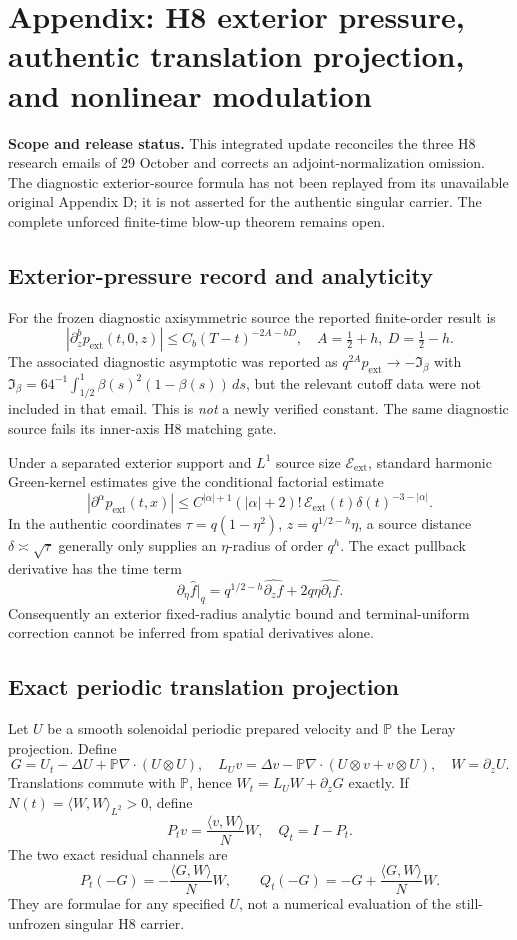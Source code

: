 \clearpage
\section*{Appendix: H8 exterior pressure, authentic translation projection, and nonlinear modulation}
\noindent\textbf{Scope and release status.} This integrated update reconciles the three H8 research emails of 29 October and corrects an adjoint-normalization omission. The diagnostic exterior-source formula has not been replayed from its unavailable original Appendix D; it is not asserted for the authentic singular carrier. The complete unforced finite-time blow-up theorem remains open.

\subsection*{Exterior-pressure record and analyticity}
For the frozen diagnostic axisymmetric source the reported finite-order result is
\[
|\partial_z^bp_{\mathrm{ext}}(t,0,z)|\le C_b(T-t)^{-2A-bD},\quad
A=\tfrac12+h,\ D=\tfrac12-h.
\]
The associated diagnostic asymptotic was reported as $q^{2A}p_{\mathrm{ext}}\to-\mathfrak I_\beta$ with $\mathfrak I_\beta=64^{-1}\int_{1/2}^1\beta(s)^2(1-\beta(s))\,ds$, but the relevant cutoff data were not included in that email. This is \emph{not} a newly verified constant. The same diagnostic source fails its inner-axis H8 matching gate.

Under a separated exterior support and $L^1$ source size $\mathcal E_{\mathrm{ext}}$, standard harmonic Green-kernel estimates give the conditional factorial estimate
\[
|\partial^\alpha p_{\mathrm{ext}}(t,x)|\le
C^{|\alpha|+1}(|\alpha|+2)!\,
\mathcal E_{\mathrm{ext}}(t)\delta(t)^{-3-|\alpha|}.
\]
In the authentic coordinates $\tau=q(1-\eta^2)$, $z=q^{1/2-h}\eta$, a source distance $\delta\asymp\sqrt{\tau}$ generally only supplies an $\eta$-radius of order $q^h$. The exact pullback derivative has the time term
\[
\partial_\eta \widehat f\big|_q=
q^{1/2-h}\widehat{\partial_zf}+2q\eta\widehat{\partial_tf}.
\]
Consequently an exterior fixed-radius analytic bound and terminal-uniform correction cannot be inferred from spatial derivatives alone.

\subsection*{Exact periodic translation projection}
Let $U$ be a smooth solenoidal periodic prepared velocity and $\mathbb P$ the Leray projection. Define
\[
G=U_t-\Delta U+\mathbb P\nabla\cdot(U\otimes U),\quad
L_Uv=\Delta v-\mathbb P\nabla\cdot(U\otimes v+v\otimes U),\quad W=\partial_zU.
\]
Translations commute with $\mathbb P$, hence $W_t=L_UW+\partial_zG$ exactly. If $N(t)=\langle W,W\rangle_{L^2}>0$, define
\[
P_tv=\frac{\langle v,W\rangle}{N}W,\quad Q_t=I-P_t.
\]
The two exact residual channels are
\[
P_t(-G)=-\frac{\langle G,W\rangle}{N}W,\qquad
Q_t(-G)=-G+\frac{\langle G,W\rangle}{N}W.
\]
They are formulae for any specified $U$, not a numerical evaluation of the still-unfrozen singular H8 carrier.

